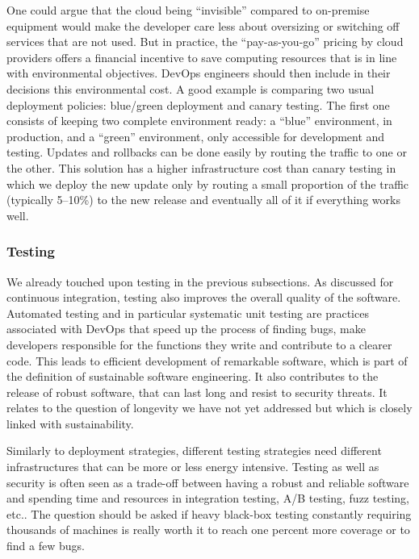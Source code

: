 \documentclass[11pt,twocolumn]{article}
\begin{document}
One could argue that the cloud being ``invisible'' compared to on-premise equipment would make the developer care less about oversizing or switching off services that are not used. But in practice, the ``pay-as-you-go'' pricing by cloud providers offers a financial incentive to save computing resources that is in line with environmental objectives. DevOps engineers should then include in their decisions this environmental cost. A good example is comparing two usual deployment policies: blue/green deployment and canary testing. The first one consists of keeping two complete environment ready: a ``blue'' environment, in production, and a ``green'' environment, only accessible for development and testing. Updates and rollbacks can be done easily by routing the traffic to one or the other. This solution has a higher infrastructure cost than canary testing in which we deploy the new update only by routing a small proportion of the traffic (typically 5--10\%) to the new release and eventually all of it if everything works well.


\subsubsection{Testing}
We already touched upon testing in the previous subsections. As discussed for continuous integration, testing also improves the overall quality of the software. Automated testing and in particular systematic unit testing are practices associated with DevOps that speed up the process of finding bugs, make developers responsible for the functions they write and contribute to a clearer code. This leads to efficient development of remarkable software, which is part of the definition of sustainable software engineering. It also contributes to the release of robust software, that can last long and resist to security threats. It relates to the question of longevity we have not yet addressed but which is closely linked with sustainability. 

Similarly to deployment strategies, different testing strategies need different infrastructures that can be more or less energy intensive. Testing as well as security is often seen as a trade-off between having a robust and reliable software and spending time and resources in integration testing, A/B testing, fuzz testing, etc.. The question should be asked if heavy black-box testing constantly requiring thousands of machines is really worth it to reach one percent more coverage or to find a few bugs.
\end{document}
